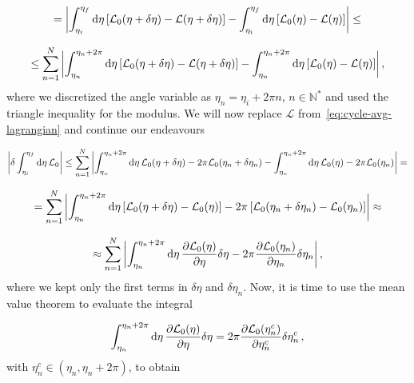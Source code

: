 \documentclass[12pt, class=report, crop=false]{standalone}
\begin{document}
\begin{equation*}
  = \abs{\int_{\eta_i}^{\eta_f} \dd{\eta} \left[\mathcal{L}_0 (\eta+\delta\eta) - \mathcal{L}(\eta+\delta\eta) \right] - \int_{\eta_i}^{\eta_f} \dd{\eta} \left[\mathcal{L}_0 (\eta) - \mathcal{L}(\eta) \right]} \leq
\end{equation*}

\begin{equation*}
  \leq \sum_{n=1}^{N} \abs{\int_{\eta_n}^{\eta_n + 2\pi} \dd{\eta} \left[\mathcal{L}_0 (\eta+\delta\eta) - \mathcal{L}(\eta+\delta\eta) \right] - \int_{\eta_n}^{\eta_n + 2\pi} \dd{\eta} \left[\mathcal{L}_0 (\eta) - \mathcal{L}(\eta) \right]}\,,
\end{equation*}
where we discretized the angle variable as \(\eta_n = \eta_i +2\pi n\), \(n \in \mathbb{N}^*\) and used the triangle inequality for the modulus. We will now replace \(\mathcal{L}\) from~\cref{eq:cycle-avg-lagrangian} and continue our endeavours

\begin{equation*}
  \abs{\delta \int_{\eta_i}^{\eta_f} \dd{\eta} \mathcal{L}_0} \leq \sum_{n=1}^{N} \abs{\int_{\eta_n}^{\eta_n + 2\pi} \dd{\eta} \mathcal{L}_0 (\eta+\delta\eta) - 2 \pi \mathcal{L}_0 (\eta_n +\delta\eta_n) - \int_{\eta_n}^{\eta_n + 2\pi} \dd{\eta} \mathcal{L}_0 (\eta) - 2\pi \mathcal{L}_0 (\eta_n)} =
\end{equation*}

\begin{equation*}
  = \sum_{n=1}^{N} \abs{\int_{\eta_n}^{\eta_n + 2\pi} \dd{\eta} \left[ \mathcal{L}_0 (\eta+\delta\eta) - \mathcal{L}_0 (\eta)\right] - 2\pi \left[ \mathcal{L}_0 (\eta_n+\delta\eta_n) - \mathcal{L}_0 (\eta_n)\right]} \approx
\end{equation*}

\begin{equation*}
  \approx \sum_{n=1}^{N} \abs{\int_{\eta_n}^{\eta_n + 2\pi} \dd{\eta} \pdv{\mathcal{L}_0 (\eta)}{\eta} \delta \eta -2\pi \pdv{\mathcal{L}_0 (\eta_n)}{\eta_n} \delta \eta_n}\,,
\end{equation*}
where we kept only the first terms in \(\delta \eta\) and \(\delta \eta_n\). Now, it is time to use the mean value theorem to evaluate the integral

\begin{equation*}
  \int_{\eta_n}^{\eta_n + 2\pi} \dd{\eta} \pdv{\mathcal{L}_0 (\eta)}{\eta} \delta \eta = 2 \pi \pdv{\mathcal{L}_0 (\eta_n^c)}{\eta_n^c} \delta \eta_n^c\,,
\end{equation*}
with \(\eta_n^c \in (\eta_n, \eta_n +2\pi)\), to obtain
\end{document}
